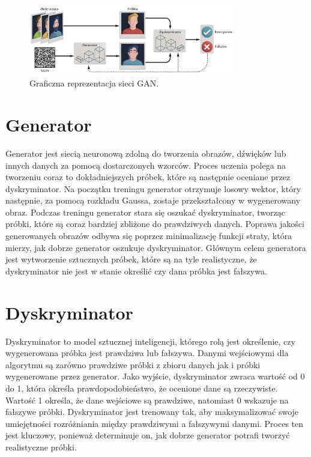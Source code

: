 \documentclass[eng,printmode]{mgr}
\begin{document}
\begin{figure}[H]
	\centering
	\includegraphics[width=0.8\textwidth]{figures/GAN_reprezentacja_graficzna.png}
	\caption{Graficzna reprezentacja sieci GAN.}
	\label{fig:GAN_rep}
\end{figure}

\section{Generator}

Generator jest siecią neuronową zdolną do tworzenia obrazów, dźwięków lub innych danych za pomocą dostarczonych wzorców. Proces uczenia polega na tworzeniu coraz to dokładniejszych próbek, które są następnie oceniane przez dyskryminator. Na początku treningu generator otrzymuje losowy wektor, który następnie, za pomocą rozkładu Gaussa, zostaje przekształcony w wygenerowany obraz. Podczas treningu generator stara się oszukać dyskryminator, tworząc próbki, które są coraz bardziej zbliżone do prawdziwych danych. Poprawa jakości generowanych obrazów odbywa się poprzez minimalizację funkcji straty, która mierzy, jak dobrze generator oszukuje dyskryminator. Głównym celem generatora jest wytworzenie sztucznych próbek, które są na tyle realistyczne, że dyskryminator nie jest w stanie określić czy dana próbka jest fałszywa. 






\section{Dyskryminator}

Dyskryminator to model sztucznej inteligencji, którego rolą jest określenie, czy wygenerowana próbka jest prawdziwa lub fałszywa. Danymi wejściowymi dla algorytmu są  zarówno prawdziwe próbki z zbioru danych jak i próbki wygenerowane przez generator.  Jako wyjście, dyskryminator zwraca wartość od 0 do 1, która określa prawdopodobieństwo, że ocenione dane są rzeczywiste. Wartość 1 określa, że dane wejściowe są prawdziwe, natomiast 0 wskazuje na fałszywe próbki. Dyskryminator jest trenowany tak, aby maksymalizować swoje umiejętności rozróżniania między prawdziwymi a fałszywymi danymi. Proces ten jest kluczowy, ponieważ determinuje on, jak dobrze generator potrafi tworzyć realistyczne próbki.
\end{document}
